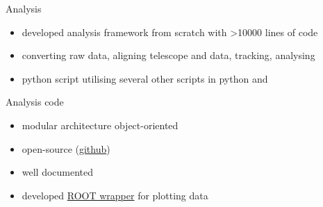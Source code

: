 \begin{frame}{Analysis}
%
  \begin{subfigures}
  \end{subfigures}
%
  \begin{itemize}\itemfill
    \item developed analysis framework from scratch with \num{>10000} lines of code
    \item converting raw data, aligning telescope and data, tracking, analysing
    \item python script utilising several other scripts in python and \cpp
  \end{itemize}
%
\end{frame}
\begin{frame}{Analysis code}
%
  \begin{minipage}{.45\textwidth}
    \begin{itemize}\itemspace{2ex}
      \item modular architecture \ra object-oriented
      \item open-source (\href{https://github.com/diamondIPP/RateAnalysis.git}{github})
      \item well documented
      \item developed \href{https://github.com/michareichmann/rootplots.git}{ROOT wrapper} for plotting data
    \end{itemize}
  \end{minipage}
  \begin{minipage}{.52\textwidth}
  \end{minipage}
%
\end{frame}
